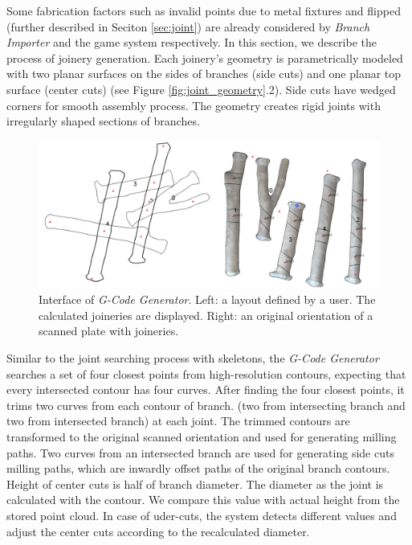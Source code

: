 Some fabrication factors such as invalid points due to metal fixtures and flipped (further described in Seciton \ref{sec:joint}) are already considered by \textit{Branch Importer} and the game system respectively.
In this section, we describe the process of joinery generation.
Each joinery's geometry is parametrically modeled with two planar surfaces on the sides of branches (side cuts) and one planar top surface (center cuts) (see Figure \ref{fig:joint_geometry}.2).
Side cuts have wedged corners for smooth assembly process.
The geometry creates rigid joints with irregularly shaped sections of branches.\\

\begin{figure}[ht]
  \begin{center}
    \includegraphics[width = 0.4\paperwidth]{images/system/joint_generator_2.png}
    \caption{Interface of \textit{G-Code Generator}. Left: a layout defined by a user. The calculated joineries are displayed. Right: an original orientation of a scanned plate with joineries. }
    \label{fig:gcode_gen}
  \end{center}
\end{figure}

Similar to the joint searching process with skeletons, the \textit{G-Code Generator} searches a set of four closest points from high-resolution contours, expecting that every intersected contour has four curves.
After finding the four closest points, it trims two curves from each contour of branch. (two from intersecting branch and two from intersected branch) at each joint.
The trimmed contours are transformed to the original scanned orientation and used for generating milling paths.
Two curves from an intersected branch are used for generating side cuts milling paths, which are inwardly offset paths of the original branch contours.
Height of center cuts is half of branch diameter.
The diameter as the joint is calculated with the contour.
We compare this value with actual height from the stored point cloud.
In case of uder-cuts, the system detects different values and adjust the center cuts according to the recalculated diameter.

